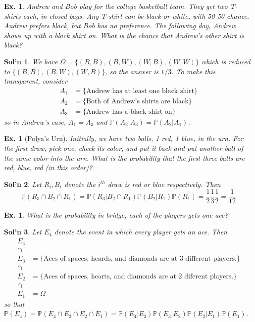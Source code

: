 \documentclass[12pt, a4paper]{book}
\renewcommand{\Pr}{\mathbb{P}}
\newtheorem{example}[theorem]{Ex.}
\theoremstyle{nonumberplain}
\newtheorem{solution}{Sol'n}
\begin{document}
\begin{example}
    Andrew and Bob play for the college basketball team.
    They get two T-shirts each, in closed bags.
    Any T-shirt can be black or white, with 50-50 chance.
    Andrew prefers black, but Bob has no preference.
    The following day, Andrew shows up with a black shirt on.
    What is the chance that Andrew's other shirt is black?
\end{example}
\begin{solution}
    We have $\Omega=\{(B,B),(B,W),(W,B),(W,W)\}$ which is reduced to $\{(B,B),(B,W),(W,B)\}$, so the answer is $1/3$.
    To make this transparent, consider
    \begin{align*}
        A_1&=\{\text{Andrew has at least one black shirt}\}\\
        A_2&=\{\text{Both of Andrew's shirts are black}\}\\
        A_3&=\{\text{Andrew has a black shirt on}\}
    \end{align*}
    so in Andrew's case, $A_1=A_3$ and $\Pr(A_2|A_3)=\Pr(A_2|A_1)$.
\end{solution}
\begin{example}[Polya's Urn]
    Initially, we have two balls, 1 red, 1 blue, in the urn.
    For the first draw, pick one, check its color, and put it back and put another ball of the same color into the urn.
    What is the probability that the first three balls are red, blue, red (in this order)?
\end{example}
\begin{solution}
    Let $R_i,B_i$ denote the $i^{th}$ draw is red or blue respectively.
    Then
    \[\Pr(R_3\cap B_2\cap R_1)=\Pr(R_3|B_2\cap R_1)\Pr(B_2|R_1)\Pr(R_1)=\frac{1}{2}\frac{1}{3}\frac{1}{2}=\frac{1}{12}\]
\end{solution}
\begin{example}
    What is the probability in bridge, each of the players gets one ace?
\end{example}
\begin{solution}
    Let $E_4$ denote the event in which every player gets an ace.
    Then
    \begin{align*}
        E_4&\\
        \cap&\\
        E_3&=\{\text{Aces of spaces, heards, and diamonds are at 3 different players.}\}\\
        \cap&\\
        E_2&=\{\text{Aces of spaces, hearts, and diamonds are at 2 diferent players.}\}\\
        \cap&\\
        E_1&=\Omega
    \end{align*}
    so that $\Pr(E_4)=\Pr(E_4\cap E_3\cap E_2\cap E_1)=\Pr(E_4|E_3)\Pr(E_3|E_2)\Pr(E_2|E_1)\Pr(E_1)$.
\end{solution}
\end{document}
